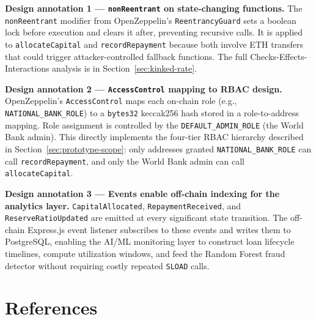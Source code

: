 \documentclass[12pt,a4paper]{report}
\begin{document}
\textbf{Design annotation 1 --- \texttt{nonReentrant} on state-changing functions.}
The \texttt{nonReentrant} modifier from OpenZeppelin's \texttt{ReentrancyGuard} sets a boolean lock before execution and clears it after, preventing recursive calls. It is applied to \texttt{allocateCapital} and \texttt{recordRepayment} because both involve ETH transfers that could trigger attacker-controlled fallback functions. The full Checks-Effects-Interactions analysis is in Section~\ref{sec:kinked-rate}.

\textbf{Design annotation 2 --- \texttt{AccessControl} mapping to RBAC design.}
OpenZeppelin's \texttt{AccessControl} maps each on-chain role (e.g., \texttt{NATIONAL\_BANK\_ROLE}) to a \texttt{bytes32} keccak256 hash stored in a role-to-address mapping. Role assignment is controlled by the \texttt{DEFAULT\_ADMIN\_ROLE} (the World Bank admin). This directly implements the four-tier RBAC hierarchy described in Section~\ref{sec:prototype-scope}: only addresses granted \texttt{NATIONAL\_BANK\_ROLE} can call \texttt{recordRepayment}, and only the World Bank admin can call \texttt{allocateCapital}.

\textbf{Design annotation 3 --- Events enable off-chain indexing for the analytics layer.}
\texttt{CapitalAllocated}, \texttt{RepaymentReceived}, and \texttt{ReserveRatioUpdated} are emitted at every significant state transition. The off-chain Express.js event listener subscribes to these events and writes them to PostgreSQL, enabling the AI/ML monitoring layer to construct loan lifecycle timelines, compute utilization windows, and feed the Random Forest fraud detector without requiring costly repeated \texttt{SLOAD} calls.

\chapter*{References}
{}
\end{document}
